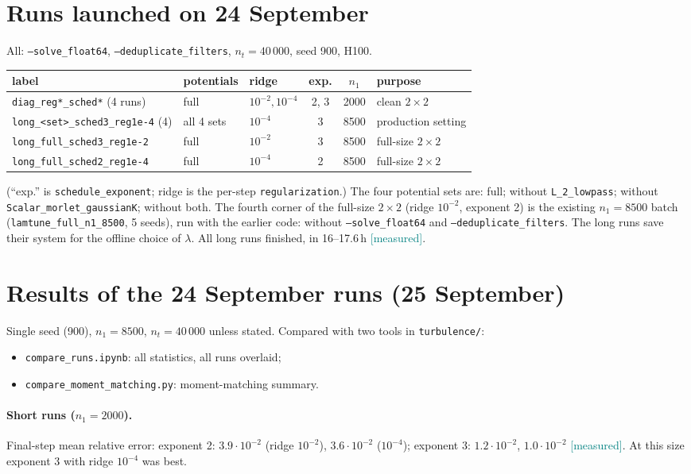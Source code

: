 \documentclass[11pt,a4paper]{article}
\newcommand{\code}[1]{\texttt{#1}}
\newcommand{\meas}{\textcolor{teal}{\textsf{[measured]}}}
\begin{document}
\section{Runs launched on 24 September}\nopagebreak
All: \code{--solve\_float64}, \code{--deduplicate\_filters}, $n_t=40\,000$, seed 900, H100.
\begin{center}\small
\begin{tabular}{@{}lllccl@{}}
\toprule
label & potentials & ridge & exp. & $n_1$ & purpose\\
\midrule
\code{diag\_reg*\_sched*} (4 runs) & full & $10^{-2},10^{-4}$ & 2, 3 & 2000 & clean $2\times2$\\
\code{long\_<set>\_sched3\_reg1e-4} (4) & all 4 sets & $10^{-4}$ & 3 & 8500 & production setting\\
\code{long\_full\_sched3\_reg1e-2} & full & $10^{-2}$ & 3 & 8500 & full-size $2\times2$\\
\code{long\_full\_sched2\_reg1e-4} & full & $10^{-4}$ & 2 & 8500 & full-size $2\times2$\\
\bottomrule
\end{tabular}
\end{center}
(``exp.'' is \code{schedule\_exponent}; ridge is the per-step \code{regularization}.)
The four potential sets are: full; without \code{L\_2\_lowpass}; without
\code{Scalar\_morlet\_gaussianK}; without both. The fourth corner of the full-size $2\times2$
(ridge $10^{-2}$, exponent 2) is the existing $n_1=8500$ batch (\code{lamtune\_full\_n1\_8500},
5 seeds), run with the earlier code: without \code{--solve\_float64} and
\code{--deduplicate\_filters}. The long runs save their system for the offline choice of $\lambda$.
All long runs finished, in 16--17.6\,h \meas.

\section{Results of the 24 September runs (25 September)}\label{sec:results}
Single seed (900), $n_1=8500$, $n_t=40\,000$ unless stated. Compared with two tools in
\code{turbulence/}:
\begin{itemize}
  \item \code{compare\_runs.ipynb}: all statistics, all runs overlaid;
  \item \code{compare\_moment\_matching.py}: moment-matching summary.
\end{itemize}

\paragraph{Short runs ($n_1=2000$).} Final-step mean relative error: exponent 2: $3.9\cdot10^{-2}$
(ridge $10^{-2}$), $3.6\cdot10^{-2}$ ($10^{-4}$); exponent 3: $1.2\cdot10^{-2}$, $1.0\cdot10^{-2}$ \meas.
At this size exponent 3 with ridge $10^{-4}$ was best.
\end{document}
